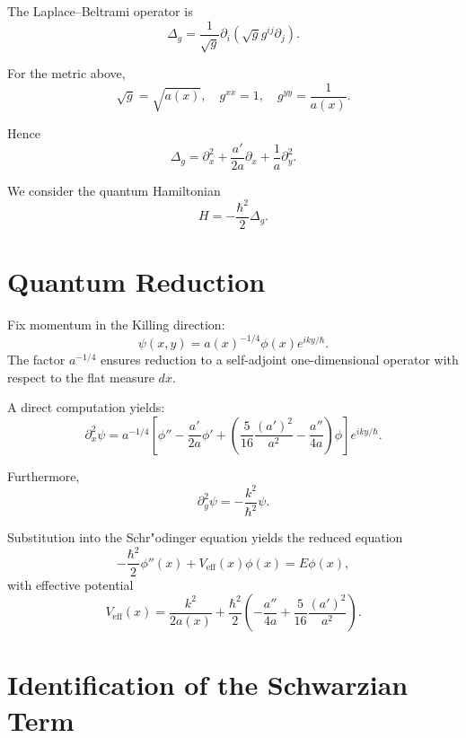 \documentclass[11pt]{article}
\begin{document}
The Laplace--Beltrami operator is
\begin{equation}
\Delta_g = \frac{1}{\sqrt{g}} \partial_i \left( \sqrt{g} g^{ij} \partial_j \right).
\end{equation}

For the metric above,
\[
\sqrt{g} = \sqrt{a(x)}, \quad g^{xx} = 1, \quad g^{yy} = \frac{1}{a(x)}.
\]

Hence
\begin{equation}
\Delta_g=\partial_x^2+\frac{a'}{2a}\partial_x+\frac{1}{a}\partial_y^2.
\end{equation}

We consider the quantum Hamiltonian
\begin{equation}
H = -\frac{\hbar^2}{2}\Delta_g.
\end{equation}

\section{Quantum Reduction}

Fix momentum in the Killing direction:
\begin{equation}
\psi(x,y)=a(x)^{-1/4}\phi(x)e^{i k y/\hbar}.
\end{equation}
The factor $a^{-1/4}$ ensures reduction to a self-adjoint one-dimensional operator with respect to the flat measure $dx$.

A direct computation yields:
\begin{equation}
\partial_x^2 \psi=a^{-1/4}\left[\phi''-\frac{a'}{2a}\phi'+\left(\frac{5}{16}\frac{(a')^2}{a^2}
-\frac{a''}{4a}\right)\phi\right]e^{iky/\hbar}.
\end{equation}

Furthermore,
\begin{equation}
\partial_y^2 \psi = -\frac{k^2}{\hbar^2}\psi.
\end{equation}

Substitution into the Schr"odinger equation yields the reduced equation
\begin{equation}
-\frac{\hbar^2}{2}\phi''(x)+V_{\mathrm{eff}}(x)\phi(x)=E\phi(x),
\end{equation}
with effective potential
\begin{equation}
V_{\mathrm{eff}}(x)=\frac{k^2}{2a(x)}+\frac{\hbar^2}{2}\left(-\frac{a''}{4a}
+\frac{5}{16}\frac{(a')^2}{a^2}\right).
\end{equation}

\section{Identification of the Schwarzian Term}
\end{document}
